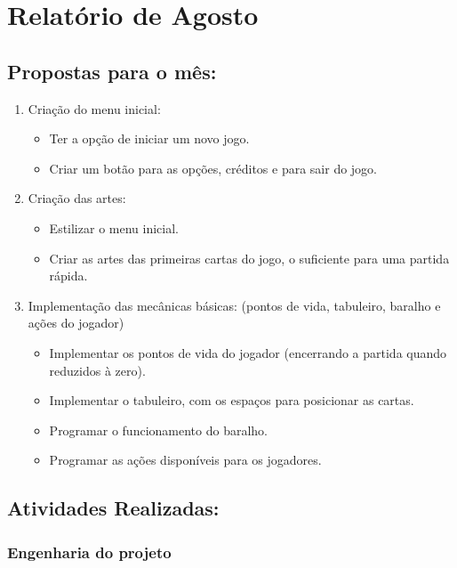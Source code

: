 \newpage
\section {Relatório de Agosto}

\subsection{Propostas para o mês:}
\begin{enumerate}
    \item Criação do menu inicial:
    \begin{itemize}
        \item Ter a opção de iniciar um novo jogo.
        \item Criar um botão para as opções, créditos e para sair do jogo.
    \end{itemize}
    
    \item Criação das artes:
    \begin{itemize}
        \item Estilizar o menu inicial.
        \item Criar as artes das primeiras cartas do jogo, o suficiente para uma partida rápida. 
    \end{itemize}
    
    \item Implementação das mecânicas básicas: (pontos de vida, tabuleiro, baralho e ações do jogador)
    \begin{itemize}
        \item Implementar os pontos de vida do jogador (encerrando a partida quando reduzidos à zero).
        \item Implementar o tabuleiro, com os espaços para posicionar as cartas.
        \item Programar o funcionamento do baralho.
        \item Programar as ações disponíveis para os jogadores.
    \end{itemize}
\end{enumerate}

\subsection{Atividades Realizadas:}

\subsubsection{Engenharia do projeto}

